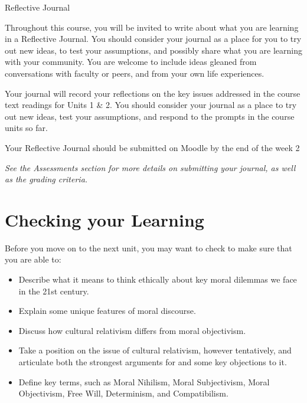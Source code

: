 \documentclass[
]{book}
\providecommand{\tightlist}{%
  \setlength{\itemsep}{0pt}\setlength{\parskip}{0pt}}
\begin{document}
\begin{assessment}
{Reflective Journal }

Throughout this course, you will be invited to write about what you are learning in a Reflective Journal. You should consider your journal as a place for you to try out new ideas, to test your assumptions, and possibly share what you are learning with your community. You are welcome to include ideas gleaned from conversations with faculty or peers, and from your own life experiences.

Your journal will record your reflections on the key issues addressed in the course text readings for Units 1 \& 2. You should consider your journal as a place to try out new ideas, test your assumptions, and respond to the prompts in the course units so far.

Your Reflective Journal should be submitted on Moodle by the end of the week 2

\emph{See the Assessments section for more details on submitting your journal, as well as the grading criteria.}
\end{assessment}

\hypertarget{checking-your-learning}{%
\section*{Checking your Learning}\label{checking-your-learning}}

\begin{progress}
Before you move on to the next unit, you may want to check to make sure that you are able to:

\begin{itemize}
\tightlist
\item
  Describe what it means to think ethically about key moral dilemmas we face in the 21st century.
\item
  Explain some unique features of moral discourse.
\item
  Discuss how cultural relativism differs from moral objectivism.
\item
  Take a position on the issue of cultural relativism, however tentatively, and articulate both the strongest arguments for and some key objections to it.
\item
  Define key terms, such as Moral Nihilism, Moral Subjectivism, Moral Objectivism, Free Will, Determinism, and Compatibilism.
\end{itemize}
\end{progress}
\end{document}
